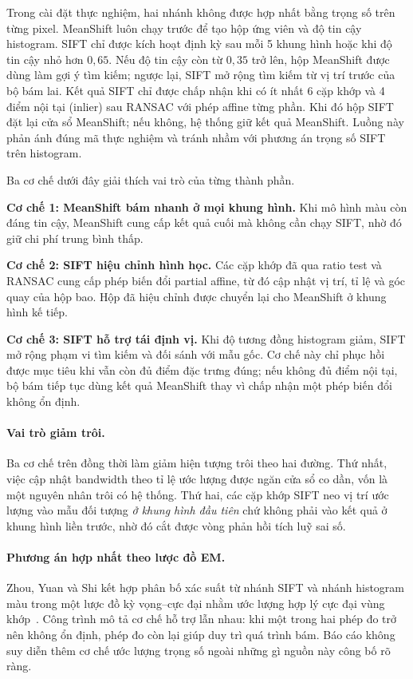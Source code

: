 \documentclass[12pt,a4paper]{article}
\numberwithin{equation}{section}
\begin{document}
Trong cài đặt thực nghiệm, hai nhánh không được hợp nhất bằng trọng số trên từng pixel. MeanShift
luôn chạy trước để tạo hộp ứng viên và độ tin cậy histogram. SIFT chỉ được kích hoạt định kỳ sau
mỗi 5 khung hình hoặc khi độ tin cậy nhỏ hơn $0{,}65$. Nếu độ tin cậy còn từ $0{,}35$ trở lên,
hộp MeanShift được dùng làm gợi ý tìm kiếm; ngược lại, SIFT mở rộng tìm kiếm từ vị trí trước của
bộ bám lai. Kết quả SIFT chỉ được chấp nhận khi có ít nhất 6 cặp khớp và 4 điểm nội tại (inlier) sau RANSAC
với phép affine từng phần. Khi đó hộp SIFT đặt lại cửa sổ MeanShift; nếu không, hệ thống giữ kết quả
MeanShift. Luồng này phản ánh đúng mã thực nghiệm và tránh nhầm với phương án trọng số SIFT trên
histogram.

Ba cơ chế dưới đây giải thích vai trò của từng thành phần.

\textbf{Cơ chế 1: MeanShift bám nhanh ở mọi khung hình.} Khi mô hình màu còn đáng tin cậy,
MeanShift cung cấp kết quả cuối mà không cần chạy SIFT, nhờ đó giữ chi phí trung bình thấp.

\textbf{Cơ chế 2: SIFT hiệu chỉnh hình học.} Các cặp khớp đã qua ratio test và RANSAC cung cấp phép
biến đổi partial affine, từ đó cập nhật vị trí, tỉ lệ và góc quay của hộp bao. Hộp đã hiệu chỉnh
được chuyển lại cho MeanShift ở khung hình kế tiếp.

\textbf{Cơ chế 3: SIFT hỗ trợ tái định vị.} Khi độ tương đồng histogram giảm, SIFT mở rộng phạm vi
tìm kiếm và đối sánh với mẫu gốc. Cơ chế này chỉ phục hồi được mục tiêu khi vẫn còn đủ điểm đặc
trưng đúng; nếu không đủ điểm nội tại, bộ bám tiếp tục dùng kết quả MeanShift thay vì chấp nhận một phép
biến đổi không ổn định.

\paragraph{Vai trò giảm trôi.} Ba cơ chế trên đồng thời làm giảm hiện tượng trôi theo hai đường.
Thứ nhất, việc cập nhật bandwidth theo tỉ lệ ước lượng được ngăn cửa sổ co dần, vốn là một nguyên
nhân trôi có hệ thống. Thứ hai, các cặp khớp SIFT neo vị trí ước lượng vào mẫu đối tượng \textit{ở
khung hình đầu tiên} chứ không phải vào kết quả ở khung hình liền trước, nhờ đó cắt được vòng phản
hồi tích luỹ sai số.

\paragraph{Phương án hợp nhất theo lược đồ EM.} Zhou, Yuan và Shi kết hợp phân bố xác suất từ
nhánh SIFT và nhánh histogram màu trong một lược đồ kỳ vọng--cực đại nhằm ước lượng hợp lý cực đại
vùng khớp~\cite{zhou2009}. Công trình mô tả cơ chế hỗ trợ lẫn nhau: khi một trong hai phép đo trở
nên không ổn định, phép đo còn lại giúp duy trì quá trình bám. Báo cáo không suy diễn thêm cơ chế
ước lượng trọng số ngoài những gì nguồn này công bố rõ ràng.
\end{document}
